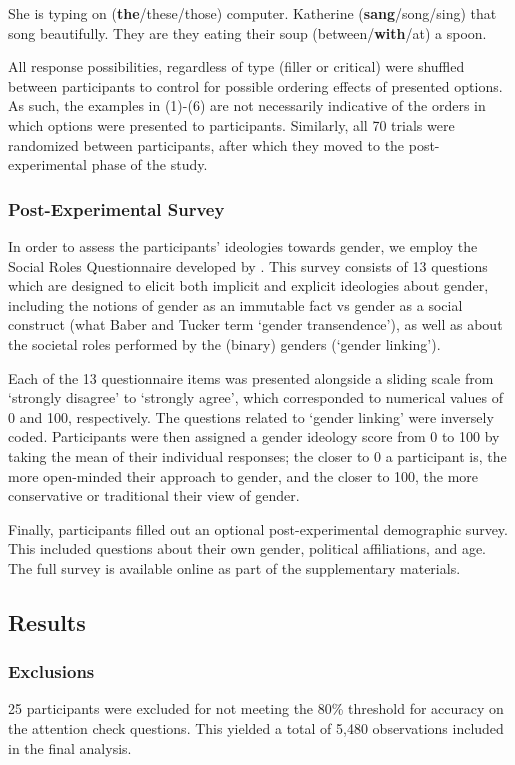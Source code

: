 \begin{exe}
	\ex She is typing on (\textbf{the}/these/those) computer.
	\ex Katherine (\textbf{sang}/song/sing) that song beautifully. 
	\ex They are they eating their soup (between/\textbf{with}/at) a spoon.
\end{exe}

All response possibilities, regardless of type (filler or critical) were shuffled between participants to control for possible ordering effects of presented options. As such, the examples in (1)-(6) are not necessarily indicative of the orders in which options were presented to participants. Similarly, all 70 trials were randomized between participants, after which they moved to the post-experimental phase of the study. 

\subsubsection{Post-Experimental Survey} In order to assess the participants' ideologies towards gender, we employ the Social Roles Questionnaire developed by \textcite{baber2006social}. This survey consists of 13 questions which are designed to elicit both implicit and explicit ideologies about gender, including the notions of gender as an immutable fact vs gender as a social construct (what Baber and Tucker term `gender transendence'), as well as about the societal roles performed by the (binary) genders (`gender linking').\par 
Each of the 13 questionnaire items was presented alongside a sliding scale from `strongly disagree' to `strongly agree', which corresponded to numerical values of 0 and 100, respectively. The questions related to `gender linking' were inversely coded. Participants were then assigned a gender ideology score from 0 to 100 by taking the mean of their individual responses; the closer to 0 a participant is, the more open-minded their approach to gender, and the closer to 100, the more conservative or traditional their view of gender.\par 
Finally, participants filled out an optional post-experimental demographic survey. This included questions about their own gender, political affiliations, and age. The full survey is available online as part of the supplementary materials.

\subsection{Results}
\subsubsection{Exclusions} 25 participants were excluded for not meeting the 80\% threshold for accuracy on the attention check questions. This yielded a total of 5,480 observations included in the final analysis.

